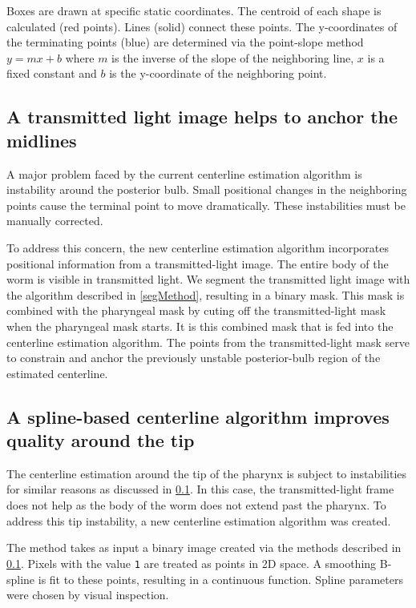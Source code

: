Boxes are drawn at specific static coordinates. The centroid of each shape is calculated (red points). Lines (solid) connect these points. The y-coordinates of the terminating points (blue) are determined via the point-slope method $y=mx+b$ where $m$ is the inverse of the slope of the neighboring line, $x$ is a fixed constant and $b$ is the y-coordinate of the neighboring point.


\subsection{A transmitted light image helps to anchor the midlines} \label{TLMidlines}
A major problem faced by the current centerline estimation algorithm is instability around the posterior bulb. Small positional changes in the neighboring points cause the terminal point to move dramatically. These instabilities must be manually corrected.

To address this concern, the new centerline estimation algorithm incorporates positional information from a transmitted-light image. The entire body of the worm is visible in transmitted light. We segment the transmitted light image with the algorithm described in \ref{segMethod}, resulting in a binary mask. This mask is combined with the pharyngeal mask by cuting off the transmitted-light mask when the pharyngeal mask starts. It is this combined mask that is fed into the centerline estimation algorithm. The points from the transmitted-light mask serve to constrain and anchor the previously unstable posterior-bulb region of the estimated centerline.

\subsection{A spline-based centerline algorithm improves quality around the tip}
The centerline estimation around the tip of the pharynx is subject to instabilities for similar reasons as discussed in \ref{TLMidlines}. In this case, the transmitted-light frame does not help as the body of the worm does not extend past the pharynx. To address this tip instability, a new centerline estimation algorithm was created.

The method takes as input a binary image created via the methods described in \ref{TLMidlines}. Pixels with the value \texttt{1} are treated as points in 2D space. A smoothing B-spline is fit to these points, resulting in a continuous function. Spline parameters were chosen by visual inspection.

